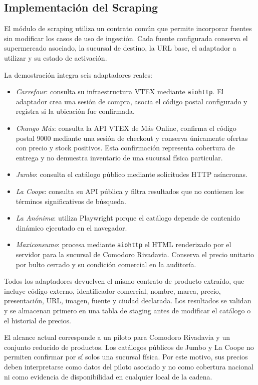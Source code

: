 \subsection{Implementación del Scraping}

El módulo de scraping utiliza un contrato común que permite incorporar fuentes
sin modificar los casos de uso de ingestión. Cada fuente configurada conserva
el supermercado asociado, la sucursal de destino, la URL base, el adaptador a
utilizar y su estado de activación.

La demostración integra seis adaptadores reales:

\begin{itemize}
    \item \textit{Carrefour}: consulta su infraestructura VTEX mediante
    \texttt{aiohttp}. El adaptador crea una sesión de compra, asocia el código
    postal configurado y registra si la ubicación fue confirmada.
    \item \textit{Chango Más}: consulta la API VTEX de Más Online, confirma el
    código postal 9000 mediante una sesión de checkout y conserva únicamente
    ofertas con precio y stock positivos. Esta confirmación representa cobertura
    de entrega y no demuestra inventario de una sucursal física particular.
    \item \textit{Jumbo}: consulta el catálogo público mediante solicitudes
    HTTP asíncronas.
    \item \textit{La Coope}: consulta su API pública y filtra resultados que no
    contienen los términos significativos de búsqueda.
    \item \textit{La Anónima}: utiliza Playwright porque el catálogo depende de
    contenido dinámico ejecutado en el navegador.
    \item \textit{Maxiconsumo}: procesa mediante \texttt{aiohttp} el HTML
    renderizado por el servidor para la sucursal de Comodoro Rivadavia. Conserva
    el precio unitario por bulto cerrado y su condición comercial en la auditoría.
\end{itemize}

Todos los adaptadores devuelven el mismo contrato de producto extraído, que
incluye código externo, identificador comercial, nombre, marca, precio,
presentación, URL, imagen, fuente y ciudad declarada. Los resultados se validan
y se almacenan primero en una tabla de staging antes de modificar el catálogo o
el historial de precios.

El alcance actual corresponde a un piloto para Comodoro Rivadavia y un conjunto
reducido de productos. Los catálogos públicos de Jumbo y La Coope no permiten
confirmar por sí solos una sucursal física. Por este motivo, sus precios deben
interpretarse como datos del piloto asociado y no como cobertura nacional ni
como evidencia de disponibilidad en cualquier local de la cadena.


